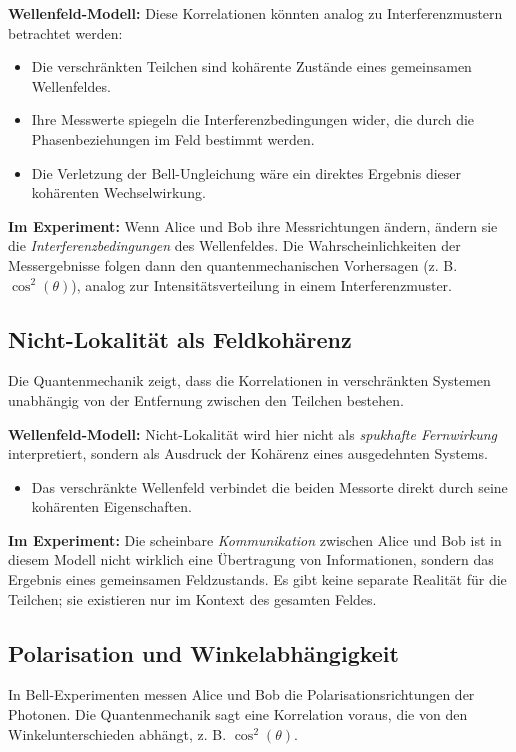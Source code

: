 \documentclass[12pt,a4paper]{article}
\begin{document}
	\textbf{Wellenfeld-Modell:}
	Diese Korrelationen könnten analog zu Interferenzmustern betrachtet werden:
	\begin{itemize}
		\item Die verschränkten Teilchen sind kohärente Zustände eines gemeinsamen Wellenfeldes.
		\item Ihre Messwerte spiegeln die Interferenzbedingungen wider, die durch die Phasenbeziehungen im Feld bestimmt werden.
		\item Die Verletzung der Bell-Ungleichung wäre ein direktes Ergebnis dieser kohärenten Wechselwirkung.
	\end{itemize}
	
	\textbf{Im Experiment:}
	Wenn Alice und Bob ihre Messrichtungen ändern, ändern sie die \textit{Interferenzbedingungen} des Wellenfeldes. Die Wahrscheinlichkeiten der Messergebnisse folgen dann den quantenmechanischen Vorhersagen (z. B. $\cos^2(\theta)$), analog zur Intensitätsverteilung in einem Interferenzmuster.
	
	\subsection{Nicht-Lokalität als Feldkohärenz}
	Die Quantenmechanik zeigt, dass die Korrelationen in verschränkten Systemen unabhängig von der Entfernung zwischen den Teilchen bestehen.
	
	\textbf{Wellenfeld-Modell:}
	Nicht-Lokalität wird hier nicht als \textit{spukhafte Fernwirkung} interpretiert, sondern als Ausdruck der Kohärenz eines ausgedehnten Systems.
	\begin{itemize}
		\item Das verschränkte Wellenfeld verbindet die beiden Messorte direkt durch seine kohärenten Eigenschaften.
	\end{itemize}
	
	\textbf{Im Experiment:}
	Die scheinbare \textit{Kommunikation} zwischen Alice und Bob ist in diesem Modell nicht wirklich eine Übertragung von Informationen, sondern das Ergebnis eines gemeinsamen Feldzustands. Es gibt keine separate Realität für die Teilchen; sie existieren nur im Kontext des gesamten Feldes.
	
	\subsection{Polarisation und Winkelabhängigkeit}
	In Bell-Experimenten messen Alice und Bob die Polarisationsrichtungen der Photonen. Die Quantenmechanik sagt eine Korrelation voraus, die von den Winkelunterschieden abhängt, z. B. $\cos^2(\theta)$.
	
\end{document}
